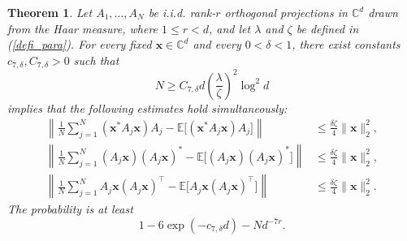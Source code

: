 \documentclass{article}
\renewcommand{\eqref}[1]{(\ref{#1})}
\newcommand{\C}{{\mathbb C}}
\newcommand{\E}{{\mathbb E}}
\newcommand{\vx}{{\mathbf x}}
\newcommand{\0}{{\mathbf 0}}
\newtheorem{theorem}{Theorem}[section]
\numberwithin{equation}{section}
\begin{document}
	\begin{theorem}
		\label{theo:concentration1-1}
		Let $A_1,\ldots,A_N$ be i.i.d. rank-$r$ orthogonal projections in $\C^d$ drawn from the Haar measure, where $1\le r<d$, and let
		$\lambda$ and $\zeta$ be defined in \eqref{defi_para}. For every fixed
		$\vx\in\C^d$ and every $0<\delta<1$, there exist constants
		$c_{7,\delta},C_{7,\delta}>0$ such that
		\begin{equation}\label{N}
			N\ge C_{7,\delta} d
			\left(\frac{\lambda}{\zeta}\right)^2\log^2d
		\end{equation}
		implies that the following estimates hold simultaneously:
		\begin{align}
			\left\|\frac1N\sum_{j=1}^N(\vx^*A_j\vx)A_j
			-\E\big[(\vx^*A_j\vx)A_j\big]\right\|
			&\le\frac{\delta\zeta}{4}\|\vx\|_2^2,
			\label{eq:eq1}\\
			\left\|\frac1N\sum_{j=1}^N(A_j\vx)(A_j\vx)^*
			-\E\big[(A_j\vx)(A_j\vx)^*\big]\right\|
			&\le\frac{\delta\zeta}{4}\|\vx\|_2^2,
			\label{eq:eq2}\\
			\left\|\frac1N\sum_{j=1}^NA_j\vx(A_j\vx)^\top
			-\E\big[A_j\vx(A_j\vx)^\top\big]\right\|
			&\le\frac{\delta\zeta}{4}\|\vx\|_2^2.
			\label{eq:eq3}
		\end{align}
		The probability is at least
		\begin{equation}\label{prob}
			1-6\exp(-c_{7,\delta} d)-Nd^{-7r}.
		\end{equation}
	\end{theorem}
	
\end{document}
